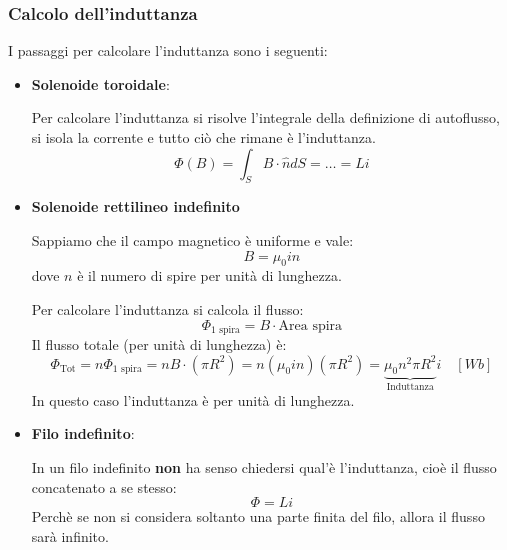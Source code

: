 \documentclass[a4paper]{article}
\begin{document}
\subsubsection{Calcolo dell'induttanza}
I passaggi per calcolare l'induttanza sono i seguenti:
\begin{itemize}
  \item \textbf{Solenoide toroidale}:

    Per calcolare l'induttanza
    si risolve l'integrale della definizione di autoflusso, si isola la corrente e tutto
    ciò che rimane è l'induttanza.
    \[
      \Phi(B) = \int_S B \cdot \hat{n} dS = \ldots = Li
    \] 

  \item \textbf{Solenoide rettilineo indefinito}

    Sappiamo che il campo magnetico è uniforme e vale:
    \[
      B = \mu_0 i n
    \] 
    dove \( n \) è il numero di spire per unità di lunghezza.

    Per calcolare l'induttanza si calcola il flusso:
    \[
      \Phi_{1 \text{ spira}} = B \cdot \text{Area spira}
    \] 
    Il flusso totale (per unità di lunghezza) è:
    \[
      \Phi_{\text{Tot}} = n \Phi_{1 \text{ spira}} = n B \cdot (\pi R^2) = n (\mu_0 i n)(\pi R^2) =
      \underbrace{\mu_0 n^2 \pi R^2}_{\text{Induttanza}} i \quad \left[ Wb \right]
    \] 
    In questo caso l'induttanza è per unità di lunghezza.

  \item \textbf{Filo indefinito}:

    In un filo indefinito \textbf{non} ha senso chiedersi qual'è l'induttanza, cioè il flusso concatenato
    a se stesso:
    \[
      \Phi = Li
    \] 
    Perchè se non si considera soltanto una parte finita del filo, allora il flusso sarà
    infinito.
\end{itemize}
\end{document}
